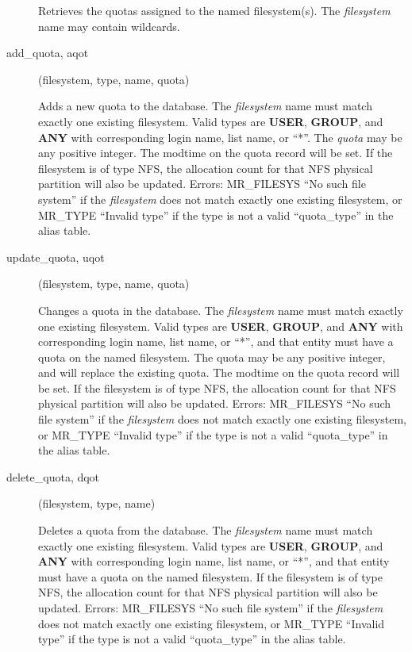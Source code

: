 \begin{description}
Retrieves the quotas assigned to the named filesystem(s).  The
{\em filesystem} name may contain wildcards.

\item[add\_quota, aqot](filesystem, type, name, quota)

Adds a new quota to the database.  The {\em filesystem} name must match
exactly one existing filesystem.  Valid types are {\bf USER}, {\bf GROUP},
and {\bf ANY} with corresponding login name, list name, or ``*''.  The
{\em quota} may be any positive integer.  The modtime on the quota
record will be set.  If the filesystem is of type NFS, the allocation
count for that NFS physical partition will also be updated.  Errors:
MR\_FILESYS ``No such file system'' if the {\em filesystem} does not match
exactly one existing filesystem, or MR\_TYPE ``Invalid type'' if the type
is not a valid ``quota\_type'' in the alias table.

\item[update\_quota, uqot](filesystem, type, name, quota)

Changes a quota in the database.  The {\em filesystem} name must match
exactly one existing filesystem.  Valid types are {\bf USER}, {\bf GROUP},
and {\bf ANY} with corresponding login name, list name, or ``*'', and that
entity must have a quota on the named filesystem.  The quota may be
any positive integer, and will replace the existing quota.  The
modtime on the quota record will be set.  If the filesystem is of type
NFS, the allocation count for that NFS physical partition will also be
updated.  Errors: MR\_FILESYS ``No such file system'' if the
{\em filesystem} does not match exactly one existing filesystem, or
MR\_TYPE ``Invalid type'' if the type is not a valid ``quota\_type'' in the
alias table.

\item[delete\_quota, dqot](filesystem, type, name)

Deletes a quota from the database.  The {\em filesystem} name must match
exactly one existing filesystem.  Valid types are {\bf USER}, {\bf GROUP},
and {\bf ANY} with corresponding login name, list name, or ``*'', and that
entity must have a quota on the named filesystem.  If the filesystem
is of type NFS, the allocation count for that NFS physical partition
will also be updated.  Errors: MR\_FILESYS ``No such file system'' if the
{\em filesystem} does not match exactly one existing filesystem, or
MR\_TYPE ``Invalid type'' if the type is not a valid ``quota\_type'' in the
alias table.


\end{description}
